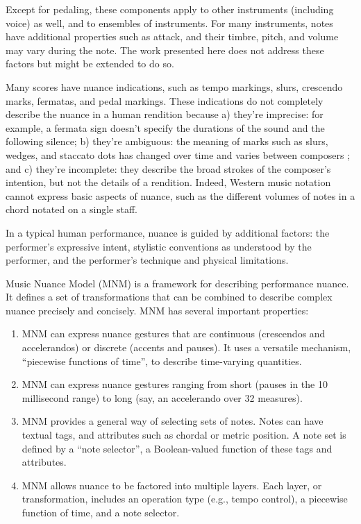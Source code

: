 \documentclass[letterpaper, 12pt]{article}
\begin{document}
Except for pedaling, these components apply to other
instruments (including voice) as well,
and to ensembles of instruments.
For many instruments, notes have additional properties such as attack,
and their timbre, pitch, and volume may vary during the note.
The work presented here does not address these factors
but might be extended to do so.

Many scores have nuance indications, such as
tempo markings, slurs, crescendo marks, fermatas, and pedal markings.
These indications do not completely describe the nuance in a human rendition
because
a) they're imprecise:
for example, a fermata sign doesn't specify the durations of the sound
and the following silence;
b) they're ambiguous:
the meaning of marks such as slurs, wedges, and staccato dots
has changed over time and varies between composers \citep{Bilson2005};
and c) they're incomplete:
they describe the broad strokes of the composer's intention,
but not the details of a rendition.
Indeed, Western music notation cannot express basic aspects of nuance,
such as the different volumes of notes in a chord notated on a single staff.

In a typical human performance,
nuance is guided by additional factors:
the performer's expressive intent,
stylistic conventions as understood by the performer,
and the performer's technique and physical limitations.

Music Nuance Model (MNM) is a framework for describing performance nuance.
It defines a set of transformations that
can be combined to describe complex nuance precisely and concisely.
MNM has several important properties:
\begin{enumerate}
\item
MNM can express nuance gestures that are continuous
(crescendos and accelerandos) or discrete (accents and pauses).
It uses a versatile mechanism, ``piecewise functions of time'',
to describe time-varying quantities.
\item
MNM can express nuance gestures ranging from
short (pauses in the 10 millisecond range)
to long (say, an accelerando over 32 measures).
\item
MNM provides a general way of selecting sets of notes.
Notes can have textual tags,
and attributes such as chordal or metric position.
A note set is defined by a ``note selector'',
a Boolean-valued function of these tags and attributes.
\item
MNM allows nuance to be factored into multiple layers.
Each layer, or transformation,
includes an operation type (e.g., tempo control),
a piecewise function of time, and a note selector.
\end{enumerate}
\end{document}
